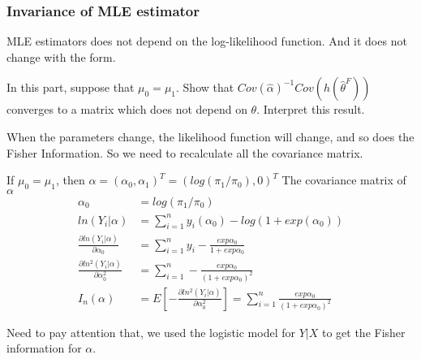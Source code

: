 \documentclass[11pt]{article} %
\begin{document}
\subsubsection{Invariance of MLE estimator}
MLE estimators does not depend on the log-likelihood function. And it does not change with the form.

	In this part, suppose that $\mu_0= \mu_1$. Show that $Cov(\hat\alpha)^{-1} Cov(h(\hat\theta^F))$ converges to a matrix which does not depend on $\theta$. Interpret this result.
	
	When the parameters change, the likelihood function will change, and so does the Fisher Information. So we need to recalculate all the covariance matrix. 
	
	If $\mu_0= \mu_1$, then $\alpha = (\alpha_0, \alpha_1)^T = \left(log(\pi_1/\pi_0) ,  0 \right)^T$
	The covariance matrix of $\alpha$
	\begin{align*}    
		\alpha_0 & = log(\pi_1/\pi_0)\\
		ln (Y_i|\alpha) &= \sum_{i=1}^n y_i (\alpha_0) - log \left(1 + exp(\alpha_0) \right)\\
		\frac{\partial ln (Y_i|\alpha)}{\partial \alpha_0}  &= \sum_{i=1}^n y_i -\frac{exp\alpha_0}{1+ exp\alpha_0}\\
		\frac{\partial ln^2 (Y_i|\alpha)}{\partial \alpha_0^2}  &= \sum_{i=1}^n -\frac{exp\alpha_0}{(1+ exp\alpha_0)^2}\\
		I_n(\alpha) &= E[-\frac{\partial ln^2 (Y_i|\alpha)}{\partial \alpha_0^2}] = \sum_{i=1}^n \frac{exp\alpha_0}{(1+ exp\alpha_0)^2}
	\end{align*} 

Need to pay attention that, we used the logistic model for $Y|X$ to get the Fisher information for $\alpha$.
\end{document}
